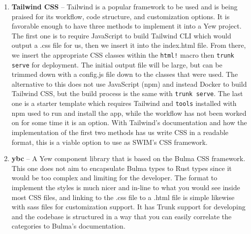 \documentclass[
    paper=letter,
    parskip=half,
    fontsize=12pt,
    titlepage=firstiscover,
    toc=bibliography,
    numbers=endperiod
]{scrartcl}
\begin{document}
\begin{enumerate}
    \item
          \textbf{Tailwind CSS} -- Tailwind is a popular framework to be used
          and is being praised for its workflow, code structure, and
          customization options. It is favorable enough to have three methods
          to implement it into a Yew project. The first one
          \cite{dev-to-tailwind-css} is to require JavaScript to build
          Tailwind CLI which would output a .css file for us, then we insert it
          into the index.html file. From there, we insert the appropriate CSS
          classes within the \texttt{html!} macro then \texttt{trunk serve} for
          deployment. The initial output file will be large, but can be
          trimmed down with a config.js file down to the classes that were
          used. The alternative \cite{tailwind-yew-builder} to this does not
          use JavaScript (npm) and instead Docker to build Tailwind CSS, but
          the build process is the same with \texttt{trunk serve}. The last one
          \cite{tailwindcss-yew-template} is a starter template which requires
          Tailwind and \texttt{tools} installed with npm used to run and install
          the app, while the workflow has not been worked on for some time it
          is an option. With Tailwind's documentation and how the
          implementation of the first two methods has us write CSS in a
          readable format, this is a viable option to use as SWIM's CSS
          framework.

    \item
          \textbf{ybc} --  A Yew component library that is based on the Bulma CSS
          framework. This one does not aim to encapsulate Bulma types to Rust
          types since it would be too complex and limiting for the developer.
          The format to implement the styles is much nicer and in-line to what
          you would see inside most CSS files, and linking to the .css file to a
          .html file is simple likewise with sass files for customization
          support. It has Trunk support for developing and the codebase is
          structured in a way that you can easily correlate the categories to
          Bulma's documentation.


\end{enumerate}
\end{document}
